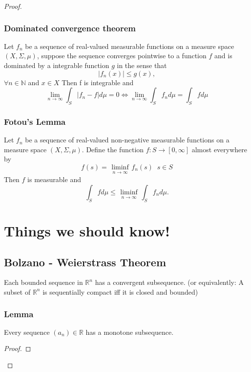 \documentclass[titlepage]{article}
\begin{document}
\begin{proof}
\subsubsection{Dominated convergence theorem}
 Let $f_n$ be a sequence of real-valued measurable functions on a measure space $(X,\Sigma, \mu)$, suppose the sequence converges pointwise to a function $f$ and is dominated by a integrable function $g$ in the sense that
 \begin{equation}
 |f_n(x)| \leq g(x),
 \end{equation}
 $\forall n\in \mathbb{N}$ and $x\in X$
 Then f is integrable and 
 \begin{equation}
 \lim_{n\rightarrow \infty} \int_S |f_n - f|d\mu = 0 \Longleftrightarrow
 \lim_{n\rightarrow \infty} \int_S f_n d\mu = \int_S f d\mu 
 \end{equation}
 
 \subsubsection{Fotou's Lemma}
  Let $f_n$ be a sequence of real-valued non-negative measurable functions on a measure space $(X,\Sigma, \mu)$. Define the function $f: S \rightarrow [0,\infty]$ almost everywhere by
  \begin{equation}
  f(s) = \liminf \limits_{\substack{n\rightarrow \infty}} f_n(s)\;\; s\in S
  \end{equation}
Then $f$ is measurable and 
\begin{equation}
\int_S fd\mu \leq \liminf \limits_{\substack{n\rightarrow \infty}}
\int_S f_n d\mu.
\end{equation}  
  
\section{Things we should know!}
\subsection{Bolzano - Weierstrass Theorem}
Each bounded sequence in $\mathbb{R}^n$ has a convergent subsequence. 
(or equivalently: A subset of $\mathbb{R}^n$ is sequentially compact iff it is closed and bounded)

\subsubsection{Lemma}
Every sequence $(a_n) \in \mathbb{R}$ has a monotone subsequence.
\begin{proof}


\end{proof}
\end{proof}
\end{document}
